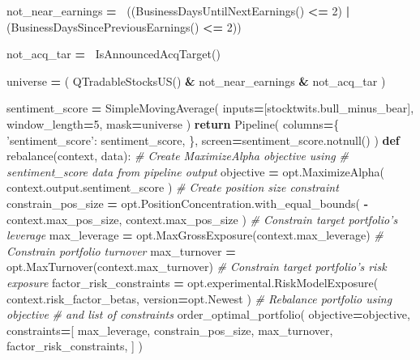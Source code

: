 \documentclass[11,]{article}
\newenvironment{Shaded}{\begin{snugshade}}{\end{snugshade}}
\newcommand{\CommentTok}[1]{\textcolor[rgb]{0.56,0.35,0.01}{\textit{#1}}}
\newcommand{\ControlFlowTok}[1]{\textcolor[rgb]{0.13,0.29,0.53}{\textbf{#1}}}
\newcommand{\DecValTok}[1]{\textcolor[rgb]{0.00,0.00,0.81}{#1}}
\newcommand{\KeywordTok}[1]{\textcolor[rgb]{0.13,0.29,0.53}{\textbf{#1}}}
\newcommand{\NormalTok}[1]{#1}
\newcommand{\OperatorTok}[1]{\textcolor[rgb]{0.81,0.36,0.00}{\textbf{#1}}}
\newcommand{\StringTok}[1]{\textcolor[rgb]{0.31,0.60,0.02}{#1}}
\begin{document}
\begin{Shaded}
\begin{Highlighting}[]
\NormalTok{    not_near_earnings }\OperatorTok{=} \OperatorTok{~}\NormalTok{((BusinessDaysUntilNextEarnings() }\OperatorTok{<=} \DecValTok{2}\NormalTok{) }\OperatorTok{|}
\NormalTok{      (BusinessDaysSincePreviousEarnings() }\OperatorTok{<=} \DecValTok{2}\NormalTok{)) }
    
\NormalTok{    not_acq_tar }\OperatorTok{=} \OperatorTok{~}\NormalTok{IsAnnouncedAcqTarget()}
    
\NormalTok{    universe }\OperatorTok{=}\NormalTok{ (}
\NormalTok{        QTradableStocksUS()}
        \OperatorTok{&}\NormalTok{ not_near_earnings}
        \OperatorTok{&}\NormalTok{ not_acq_tar}
\NormalTok{    )}
    
\NormalTok{    sentiment_score }\OperatorTok{=}\NormalTok{ SimpleMovingAverage(}
\NormalTok{        inputs}\OperatorTok{=}\NormalTok{[stocktwits.bull_minus_bear],}
\NormalTok{        window_length}\OperatorTok{=}\DecValTok{5}\NormalTok{,}
\NormalTok{        mask}\OperatorTok{=}\NormalTok{universe}
\NormalTok{    )}
    \ControlFlowTok{return}\NormalTok{ Pipeline(}
\NormalTok{        columns}\OperatorTok{=}\NormalTok{\{}
            \StringTok{'sentiment_score'}\NormalTok{: sentiment_score,}
\NormalTok{        \},}
\NormalTok{        screen}\OperatorTok{=}\NormalTok{sentiment_score.notnull()}
\NormalTok{    )}
\KeywordTok{def}\NormalTok{ rebalance(context, data):}
    \CommentTok{# Create MaximizeAlpha objective using}
    \CommentTok{# sentiment_score data from pipeline output}
\NormalTok{    objective }\OperatorTok{=}\NormalTok{ opt.MaximizeAlpha(}
\NormalTok{      context.output.sentiment_score}
\NormalTok{    )}
    \CommentTok{# Create position size constraint}
\NormalTok{    constrain_pos_size }\OperatorTok{=}\NormalTok{ opt.PositionConcentration.with_equal_bounds(}
        \OperatorTok{-}\NormalTok{context.max_pos_size,}
\NormalTok{        context.max_pos_size}
\NormalTok{    )}
    \CommentTok{# Constrain target portfolio's leverage}
\NormalTok{    max_leverage }\OperatorTok{=}\NormalTok{ opt.MaxGrossExposure(context.max_leverage)}
    \CommentTok{# Constrain portfolio turnover}
\NormalTok{    max_turnover }\OperatorTok{=}\NormalTok{ opt.MaxTurnover(context.max_turnover)}
    \CommentTok{# Constrain target portfolio's risk exposure}
\NormalTok{    factor_risk_constraints }\OperatorTok{=}\NormalTok{ opt.experimental.RiskModelExposure(}
\NormalTok{        context.risk_factor_betas,}
\NormalTok{        version}\OperatorTok{=}\NormalTok{opt.Newest}
\NormalTok{    )}
    \CommentTok{# Rebalance portfolio using objective}
    \CommentTok{# and list of constraints}
\NormalTok{    order_optimal_portfolio(}
\NormalTok{        objective}\OperatorTok{=}\NormalTok{objective,}
\NormalTok{        constraints}\OperatorTok{=}\NormalTok{[}
\NormalTok{            max_leverage,}
\NormalTok{            constrain_pos_size,}
\NormalTok{            max_turnover,}
\NormalTok{            factor_risk_constraints,}
\NormalTok{        ]}
\NormalTok{    )}
\end{Highlighting}
\end{Shaded}
\end{document}
